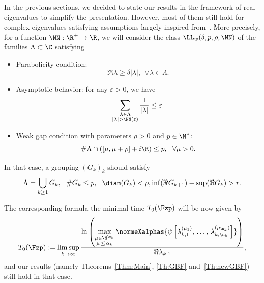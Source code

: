 In the previous sections, we decided to state our results in the framework of real eigenvalues to simplify the presentation. However, most of them still hold for complex eigenvalues satisfying assumptions largely inspired from~\cite{AmmarKhodjaBenabdallahGonzalez-BurgosdeTeresa:2014}. More precisely, for a function $\NN:\R^+\to \R$, we will consider the class $\LL_w(\delta,p,\rho,\NN)$ of the families $\Lambda\subset \C$ satisfying
\begin{itemize}
\item Parabolicity condition:
\[
\Re \lambda \geq \delta |\lambda|, \ \ \forall \lambda\in \Lambda.
\]
\item Asymptotic behavior: for any $\varepsilon>0$, we have
\[
\sum_{\substack{\lambda\in \Lambda\\ |\lambda|>\NN(\varepsilon)}} \frac{1}{|\lambda|} \leq \varepsilon.
\]
\item Weak gap condition with parameters $\rho>0$ and $p\in \N^*$:
\[
\# \Lambda \cap ([\mu,\mu+\rho]+i\R) \leq p, \ \ \forall \mu>0.
\]
\end{itemize}

In that case, a grouping $(G_k)_k$ should satisfy
\[
\Lambda=\bigcup_{k\geq 1} G_k, \ \ \# G_k\leq p, \ \ \diam(G_k)<\rho, \inf(\Re G_{k+1}) - \sup (\Re G_k) > r.
\]

The corresponding formula the minimal time $T_0(\Fzp)$ will be now given by
\[
T_0(\Fzp) := \limsup_{k\to \infty} \frac{\ln \left(\max\limits_{\substack{\mu\in \N^{\n_k}\\ \mu\,\leq\,\alpha_k}} \normeXalphas{\psi\left[\lambda_{k,1}^{(\mu_1)},\,\dotsc,\,\lambda_{k,\n_k}^{(\mu_{\n_k})}\right]}\right)}{\Re \lambda_{k,1}},
\]
and our results (namely Theorems~\ref{Thm:Main}, \ref{Th:GBF} and~\ref{Th:newGBF}) still hold in that case.

